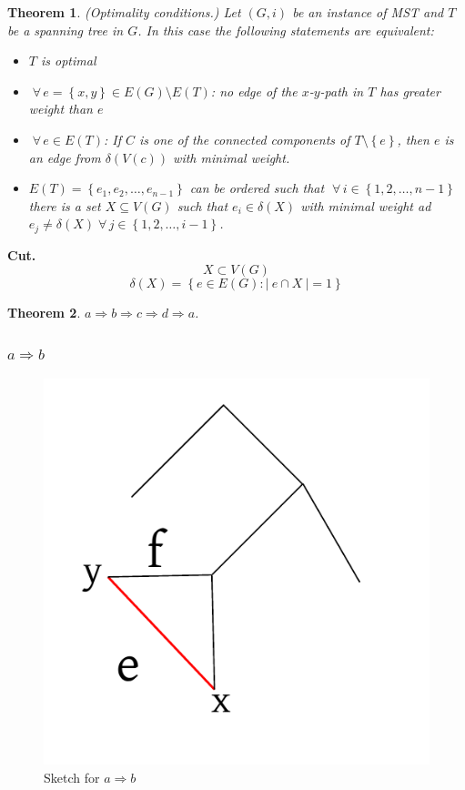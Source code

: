 \documentclass{article}
\newtheorem{theorem}{Theorem}
\newcommand{\card}[1]{\left|\:\!#1\:\!\right|}
\newcommand{\set}[1]{\left\{#1\right\}}
\newcommand{\gath}[2]{$#1$-$#2$-path} %
\newcommand{\fall}{\;\forall\,}
\begin{document}
\begin{theorem}\label{satz-2.2}
(Optimality conditions.)
Let $(G, i)$ be an instance of MST and $T$ be a spanning tree in $G$. In this case the following statements are equivalent:
\begin{itemize}
  \item $T$ is optimal
  \item $\fall e = \set{x, y} \in E(G) \setminus E(T)$: no edge of the \gath xy in $T$ has greater weight than $e$
  \item $\fall e \in E(T)$: If $C$ is one of the connected components of $T \setminus \set{e}$, then $e$ is an edge from $\delta(V(c))$ with minimal weight.
  \item $E(T) = \set{e_1, e_2, \ldots, e_{n-1}}$ can be ordered such that $\fall i \in \set{1, 2, \ldots, n-1}$ there is a set $X \subseteq V(G)$ such that $e_i \in \delta(X)$ with minimal weight ad $e_j \neq \delta(X) \fall j \in \set{1, 2, \ldots, i-1}$.
\end{itemize}
\end{theorem}

\textbf{Cut.}
\[
  X \subset V(G)
\] \[
  \delta(X) = \set{e \in E(G): \card{e \cap X} = 1}
\]

\begin{theorem}
  $a \Rightarrow b \Rightarrow c \Rightarrow d \Rightarrow a$.
\end{theorem}

\subsubsection{$a \Rightarrow b$}
%
\begin{figure}[t]
  \begin{center}
    \includegraphics{img/ab.pdf}
    \caption{Sketch for $a \Rightarrow b$}
  \end{center}
\end{figure}
\end{document}
